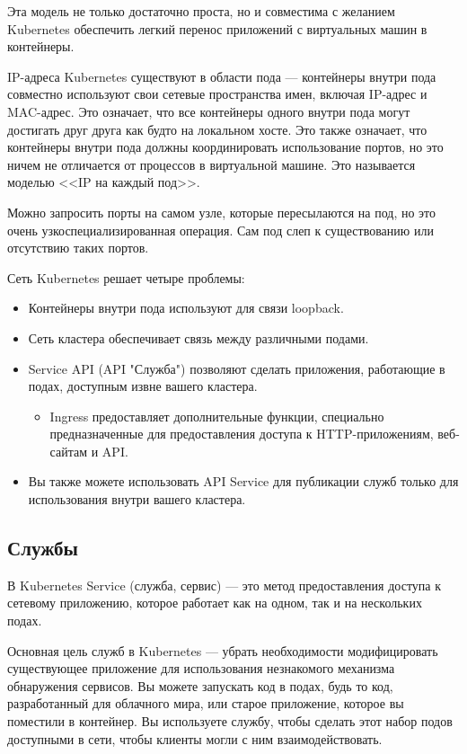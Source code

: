 \documentclass[a4page]{article}
\begin{document}
Эта модель не только достаточно проста, но и совместима с желанием Kubernetes обеспечить легкий перенос приложений с виртуальных машин в контейнеры.

IP-адреса Kubernetes существуют в области пода --- контейнеры внутри пода совместно используют свои сетевые пространства имен, включая IP-адрес и MAC-адрес. Это означает, что все контейнеры одного внутри пода могут достигать друг друга как будто на локальном хосте. Это также означает, что контейнеры внутри пода должны координировать использование портов, но это ничем не отличается от процессов в виртуальной машине. Это называется моделью <<IP на каждый под>>.

Можно запросить порты на самом узле, которые пересылаются на под, но это очень узкоспециализированная операция. Сам под слеп к существованию или отсутствию таких портов.

Сеть Kubernetes решает четыре проблемы:
\begin{itemize}
   \item Контейнеры внутри пода используют для связи loopback.
   \item Сеть кластера обеспечивает связь между различными подами.
   \item Service API (API "Служба") позволяют сделать приложения, работающие в подах, доступным извне вашего кластера.
     \begin{itemize}
       \item Ingress предоставляет дополнительные функции, специально предназначенные для предоставления доступа к HTTP-приложениям, веб-сайтам и API.
     \end{itemize}
   \item Вы также можете использовать API Service для публикации служб только для использования внутри вашего кластера.
\end{itemize}

\subsection{Службы}
В Kubernetes Service (служба, сервис) --- это метод предоставления доступа к сетевому приложению, которое работает как на одном, так и на нескольких подах\cite{k8s:service}.

Основная цель служб в Kubernetes --- убрать необходимости модифицировать существующее приложение для использования незнакомого механизма обнаружения сервисов. Вы можете запускать код в подах, будь то код, разработанный для облачного мира, или старое приложение, которое вы поместили в контейнер. Вы используете службу, чтобы сделать этот набор подов доступными в сети, чтобы клиенты могли с ним взаимодействовать.
\end{document}
